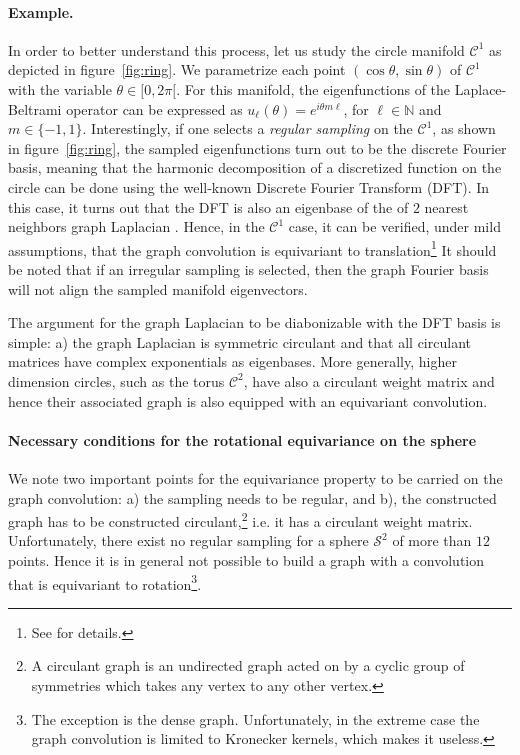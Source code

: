 \documentclass{article} %
\newcommand{\figref}[1]{figure~\ref{fig:#1}}
\newcommand{\1}{\b{1}}              %
\newcommand{\0}{\b{0}}              %
\begin{document}
\paragraph{Example.}
In order to better understand this process, let us study the circle manifold $\mathcal{C}^1$ as depicted in \figref{ring}. We parametrize each point $(\cos\theta,\sin\theta)$ of $\mathcal{C}^1$ with the variable $\theta\in[0,2\pi[$.
For this manifold, the eigenfunctions of the Laplace-Beltrami operator can be expressed as $u_\ell(\theta)=e^{i \theta m \ell}$, for $\ell \in \mathbb{N}$ and $m\in\{-1,1\}$.
Interestingly, if one selects a \emph{regular sampling} on the $\mathcal{C}^1$, as shown in \figref{ring}, the sampled eigenfunctions turn out to be the discrete Fourier basis, meaning that the harmonic decomposition of a discretized function on the circle can be done using the well-known Discrete Fourier Transform (DFT).
In this case, it turns out that the DFT is also an eigenbase of the of $2$ nearest neighbors graph Laplacian \cite{strang1999discrete}. Hence, in the $\mathcal{C}^1$ case, it can be verified, under mild assumptions, that the graph convolution is equivariant to translation\footnote{See \cite[section 2.2 and equation 3]{perraudin2017stationary} for details.}
It should be noted that if an irregular sampling is selected, then the graph Fourier basis will not align the sampled manifold eigenvectors.

The argument for the graph Laplacian to be diabonizable with the DFT basis is simple: a) the graph Laplacian is symmetric circulant and that all circulant matrices have complex exponentials as eigenbases.
More generally, higher dimension circles, such as the torus $\mathcal{C}^2$, have also a circulant weight matrix and hence their associated graph is also equipped with an equivariant convolution.

\paragraph{Necessary conditions for the rotational equivariance on the sphere}
We note two important points for the equivariance property to be carried on the graph convolution: a) the sampling needs to be regular, and b), the constructed graph has to be constructed circulant,\footnote{A circulant graph is an undirected graph acted on by a cyclic group of symmetries which takes any vertex to any other vertex.} i.e. it has a circulant weight matrix.
Unfortunately, there exist no regular sampling for a sphere $\mathcal{S}^2$ of more than $12$ points. Hence it is in general not possible to build a graph with a convolution that is equivariant to rotation\footnote{The exception is the dense graph. Unfortunately, in the extreme case the graph convolution is limited to Kronecker kernels, which makes it useless.}.
\end{document}
